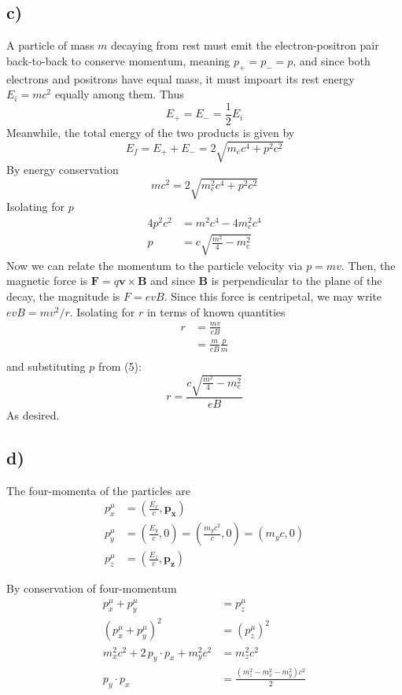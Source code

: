 \documentclass[12pt]{article}
\begin{document}
\subsection*{c)}
A particle of mass $m$ decaying from rest must emit the electron-positron pair
back-to-back to conserve momentum, meaning $p_+ = p_- = p$, and since both
electrons and positrons have equal mass, it must impoart its rest energy $E_i =
mc^2$ equally among them. Thus $$E_+ = E_- = \frac{1}{2}E_i$$
Meanwhile, the total energy of the two products is given by
$$ E_f = E_+ + E_- = 2\sqrt{m_ec^4 + p^2c^2} $$
By energy conservation
$$mc^2 = 2\sqrt{m_e^2c^4 + p^2c^2}$$
Isolating for $p$
\begin{align}
    4p^2c^2 &= m^2c^4 - 4m_e^2c^4 \\
    p       &= c\sqrt{\frac{m^2}{4} - m_e^2}
\end{align}
Now we can relate the momentum to the particle velocity via $p = mv$. Then, the
magnetic force is $\bm{F} = q\bm{v} \times \bm{B}$ and since $\bm{B}$ is 
perpendicular to the plane of the decay, the magnitude is $F = evB$. Since this
force is centripetal, we may write $evB = mv^2/r$. Isolating for $r$ in terms
of known quantities
\begin{align}
    r &= \frac{mv}{eB} \\
      &= \frac{m}{eB}\frac{p}{m} \\
\end{align}
and substituting $p$ from (5):
\begin{equation}
    \boxed{r = \frac{c\sqrt{\frac{m^2}{4} - m_e^2}}{eB}}
\end{equation}
As desired.


\subsection*{d)}
The four-momenta of the particles are 
\begin{align}
    p_x^{\mu} &= \left(\tfrac{E_x}{c}, \bm{p_x}\right) \\
    p_y^{\mu} &= \left(\tfrac{E_y}{c}, 0\right) = \left(\tfrac{m_yc^2}{c}, 0\right) = (m_yc, 0) \\
    p_z^{\mu} &= \left(\tfrac{E_z}{c}, \bm{p_z}\right)
\end{align}

By conservation of four-momentum
\begin{align}
    p_x^{\mu} + p_y^{\mu} &= p_z^{\mu} \\
    (p_x^{\mu} + p_y^{\mu})^2 &= (p_z^{\mu})^2 \\
    m_x^2c^2 + 2\, p_y \cdot p_x + m_y^2c^2 &= m_z^2c^2 \\
    p_y \cdot p_x &= \frac{(m_z^2 - m_x^2 - m_y^2)c^2}{2}
\end{align}
\end{document}
